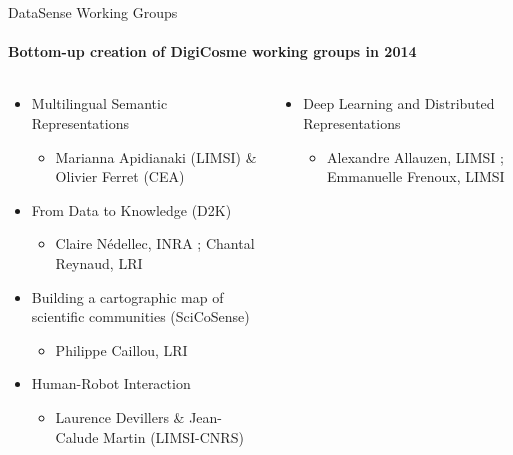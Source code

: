 \begin{frame}{DataSense Working Groups}
  \framesubtitle{Bottom-up creation of DigiCosme working groups in 2014}
  \vspace*{-8mm}

  \begin{columns}\footnotesize
    \begin{column}[t]{5.5cm}
      \begin{itemize}
      \item Multilingual Semantic Representations
        \begin{itemize}
        \item Marianna Apidianaki (LIMSI) \& Olivier Ferret (CEA)
        \end{itemize}

      \item From Data to Knowledge (D2K) 
        \begin{itemize}
        \item Claire Nédellec, INRA ; Chantal Reynaud, LRI 
        \end{itemize}

      \item Building a cartographic map of scientific communities (SciCoSense) 
        \begin{itemize}
        \item Philippe Caillou, LRI
        \end{itemize}

      \item Human-Robot Interaction
        \begin{itemize}
        \item Laurence Devillers \& Jean-Calude Martin (LIMSI-CNRS) 
        \end{itemize}
      \end{itemize}    
    \end{column}
    \begin{column}[t]{6.5cm}

      \begin{itemize}    
      \item Deep Learning and Distributed Representations
        \begin{itemize}
        \item Alexandre Allauzen, LIMSI ; Emmanuelle Frenoux, LIMSI 
        \end{itemize}


\end{itemize}
\end{column}
\end{columns}
\end{frame}
